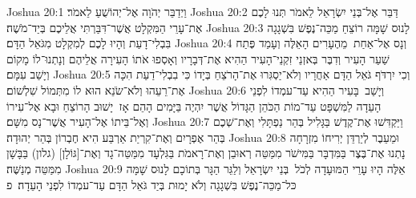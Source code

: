 Joshua 20:1	וַיְדַבֵּר יְהֹוָה אֶל־יְהוֹשֻׁעַ לֵאמֹר׃
Joshua 20:2	דַּבֵּר אֶל־בְּנֵי יִשְׂרָאֵל לֵאמֹר תְּנוּ לָכֶם אֶת־עָרֵי הַמִּקְלָט אֲשֶׁר־דִּבַּרְתִּי אֲלֵיכֶם בְּיַד־מֹשֶׁה׃
Joshua 20:3	לָנוּס שָׁמָּה רוֹצֵחַ מַכֵּה־נֶפֶשׁ בִּשְׁגָגָה בִּבְלִי־דָעַת וְהָיוּ לָכֶם לְמִקְלָט מִגֹּאֵל הַדָּם׃
Joshua 20:4	וְנָס אֶל־אַחַת  מֵהֶעָרִים הָאֵלֶּה וְעָמַד פֶּתַח שַׁעַר הָעִיר וְדִבֶּר בְּאזְנֵי זִקְנֵי־הָעִיר הַהִיא אֶת־דְּבָרָיו וְאָסְפוּ אֹתוֹ הָעִירָה אֲלֵיהֶם וְנָתְנוּ־לוֹ מָקוֹם וְיָשַׁב עִמָּם׃
Joshua 20:5	וְכִי יִרְדֹּף גֹּאֵל הַדָּם אַחֲרָיו וְלֹא־יַסְגִּרוּ אֶת־הָרֹצֵחַ בְּיָדוֹ כִּי בִבְלִי־דַעַת הִכָּה אֶת־רֵעֵהוּ וְלֹא־שֹׂנֵא הוּא לוֹ מִתְּמוֹל שִׁלְשׁוֹם׃
Joshua 20:6	וְיָשַׁב  בָּעִיר הַהִיא עַד־עמְדוֹ לִפְנֵי הָעֵדָה לַמִּשְׁפָּט עַד־מוֹת הַכֹּהֵן הַגָּדוֹל אֲשֶׁר יִהְיֶה בַּיָּמִים הָהֵם אָז  יָשׁוּב הָרוֹצֵחַ וּבָא אֶל־עִירוֹ וְאֶל־בֵּיתוֹ אֶל־הָעִיר אֲשֶׁר־נָס מִשָּׁם׃
Joshua 20:7	וַיַּקְדִּשׁוּ אֶת־קֶדֶשׁ בַּגָּלִיל בְּהַר נַפְתָּלִי וְאֶת־שְׁכֶם בְּהַר אֶפְרָיִם וְאֶת־קִרְיַת אַרְבַּע הִיא חֶבְרוֹן בְּהַר יְהוּדָה׃
Joshua 20:8	וּמֵעֵבֶר לְיַרְדֵּן יְרִיחוֹ מִזְרָחָה נָתְנוּ אֶת־בֶּצֶר בַּמִּדְבָּר בַּמִּישֹׁר מִמַּטֵּה רְאוּבֵן וְאֶת־רָאמֹת בַּגִּלְעָד מִמַּטֵּה־גָד וְאֶת־[גּוֹלָן] (גלון) בַּבָּשָׁן מִמַּטֵּה מְנַשֶּׁה׃
Joshua 20:9	אֵלֶּה הָיוּ עָרֵי הַמּוּעָדָה לְכֹל  בְּנֵי יִשְׂרָאֵל וְלַגֵּר הַגָּר בְּתוֹכָם לָנוּס שָׁמָּה כּל־מַכֵּה־נֶפֶשׁ בִּשְׁגָגָה וְלֹא יָמוּת בְּיַד גֹּאֵל הַדָּם עַד־עמְדוֹ לִפְנֵי הָעֵדָה׃ {פ}
